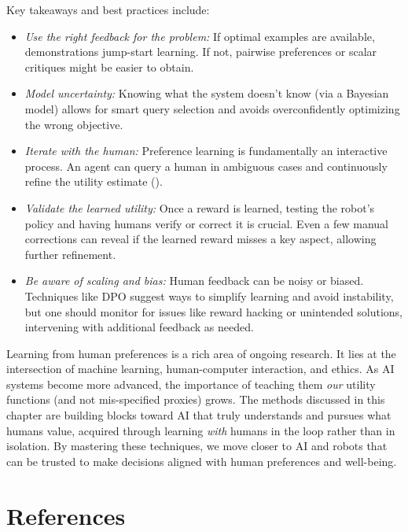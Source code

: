 \documentclass[
  letterpaper,
  numbers=noenddot,
  DIV=11]{scrreprt}
\providecommand{\tightlist}{%
  \setlength{\itemsep}{0pt}\setlength{\parskip}{0pt}}\usepackage{longtable,booktabs,array}
\theoremstyle{plain}
\theoremstyle{definition}
\theoremstyle{remark}
\begin{document}
Key takeaways and best practices include:

\begin{itemize}
\tightlist
\item
  \emph{Use the right feedback for the problem:} If optimal examples are
  available, demonstrations jump-start learning. If not, pairwise
  preferences or scalar critiques might be easier to obtain.
\item
  \emph{Model uncertainty:} Knowing what the system doesn't know (via a
  Bayesian model) allows for smart query selection and avoids
  overconfidently optimizing the wrong objective.
\item
  \emph{Iterate with the human:} Preference learning is fundamentally an
  interactive process. An agent can query a human in ambiguous cases and
  continuously refine the utility estimate
  ().
\item
  \emph{Validate the learned utility:} Once a reward is learned, testing
  the robot's policy and having humans verify or correct it is crucial.
  Even a few manual corrections can reveal if the learned reward misses
  a key aspect, allowing further refinement.
\item
  \emph{Be aware of scaling and bias:} Human feedback can be noisy or
  biased. Techniques like DPO suggest ways to simplify learning and
  avoid instability, but one should monitor for issues like reward
  hacking or unintended solutions, intervening with additional feedback
  as needed.
\end{itemize}

Learning from human preferences is a rich area of ongoing research. It
lies at the intersection of machine learning, human-computer
interaction, and ethics. As AI systems become more advanced, the
importance of teaching them \emph{our} utility functions (and not
mis-specified proxies) grows. The methods discussed in this chapter are
building blocks toward AI that truly understands and pursues what humans
value, acquired through learning \emph{with} humans in the loop rather
than in isolation. By mastering these techniques, we move closer to AI
and robots that can be trusted to make decisions aligned with human
preferences and well-being.

\section*{References}\label{bibliography-3}
\end{document}
